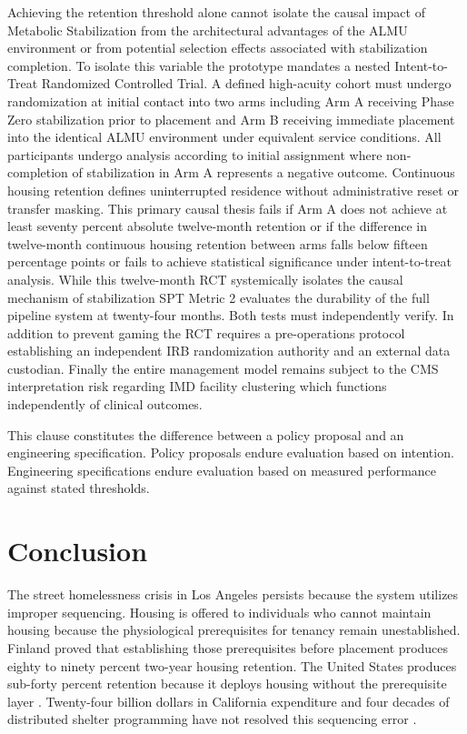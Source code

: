 \documentclass[12pt, letterpaper]{article}
\begin{document}
Achieving the retention threshold alone cannot isolate the causal impact of Metabolic Stabilization from the architectural advantages of the ALMU environment or from potential selection effects associated with stabilization completion. To isolate this variable the prototype mandates a nested Intent-to-Treat Randomized Controlled Trial. A defined high-acuity cohort must undergo randomization at initial contact into two arms including Arm A receiving Phase Zero stabilization prior to placement and Arm B receiving immediate placement into the identical ALMU environment under equivalent service conditions. All participants undergo analysis according to initial assignment where non-completion of stabilization in Arm A represents a negative outcome. Continuous housing retention defines uninterrupted residence without administrative reset or transfer masking. This primary causal thesis fails if Arm A does not achieve at least seventy percent absolute twelve-month retention or if the difference in twelve-month continuous housing retention between arms falls below fifteen percentage points or fails to achieve statistical significance under intent-to-treat analysis. While this twelve-month RCT systemically isolates the causal mechanism of stabilization SPT Metric 2 evaluates the durability of the full pipeline system at twenty-four months. Both tests must independently verify. In addition to prevent gaming the RCT requires a pre-operations protocol establishing an independent IRB randomization authority and an external data custodian. Finally the entire management model remains subject to the CMS interpretation risk regarding IMD facility clustering which functions independently of clinical outcomes.

This clause constitutes the difference between a policy proposal and an engineering specification. Policy proposals endure evaluation based on intention. Engineering specifications endure evaluation based on measured performance against stated thresholds.

\clearpage
{}
\section{Conclusion}

The street homelessness crisis in Los Angeles persists because the system utilizes improper sequencing. Housing is offered to individuals who cannot maintain housing because the physiological prerequisites for tenancy remain unestablished. Finland proved that establishing those prerequisites before placement produces eighty to ninety percent two-year housing retention. The United States produces sub-forty percent retention because it deploys housing without the prerequisite layer \citep{ucsf_bhhi_2023}. Twenty-four billion dollars in California expenditure and four decades of distributed shelter programming have not resolved this sequencing error \citep{ca_24b_expenditure_2026, finland_housing_first_2023, feantsa_finland_2022}.
\end{document}
